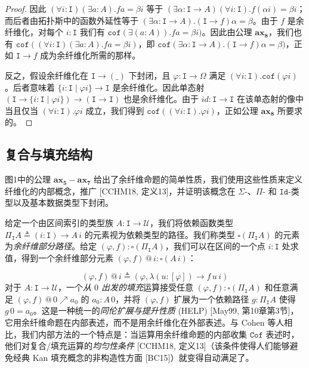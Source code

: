 \documentclass{ctexart}
\theoremstyle{plain}
\theoremstyle{definition}
\theoremstyle{definition}
\theoremstyle{definition}
\theoremstyle{definition}
\newcommand\ttI{\mathtt{I}}
\newcommand{\ax}[1]{\mathbf{ax_{#1}}}
\numberwithin{equation}{section}
\begin{document}
\begin{proof}
因此 $(\forall i : \ttI)(\exists a : A). f a = \beta i$ 等于 $(\exists \alpha : \ttI \to A)(\forall i : \ttI). f(\alpha i) = \beta i$；而后者由拓扑斯中的函数外延性等于 $(\exists \alpha : \ttI \to A). (\ttI \to f)\alpha = \beta$。由于 $f$ 是余纤维化，对每个 $i : \ttI$ 我们有 $\mathtt{cof}(\exists(a : A)). f a = \beta i)$。因此由公理 $\ax{8}$，我们也有 $\mathtt{cof}((\forall i : \ttI)(\exists a : A). f a = \beta i)$，即 $\mathtt{cof}(\exists\alpha : \ttI \to A). (\ttI \to f)\alpha = \beta)$，正如 $\ttI \to f$ 成为余纤维化所需的那样。

反之，假设余纤维化在 $\ttI \to (\_)$ 下封闭，且 $\varphi : \ttI \to \Omega$ 满足 $(\forall i : \ttI). \mathtt{cof}(\varphi i)$。后者意味着 $\{i : \ttI \mid \varphi i\} \to \ttI$ 是余纤维化。因此单态射 $(\ttI \to \{i : \ttI \mid \varphi i\}) \to (\ttI \to \ttI)$ 也是余纤维化。由于 $id : \ttI \to \ttI$ 在该单态射的像中当且仅当 $(\forall i : \ttI). \varphi i$ 成立，我们得到 $\mathtt{cof}((\forall i : \ttI). \varphi i)$，正如公理 $\ax{8}$ 所要求的。
\end{proof}

\subsection{复合与填充结构}

图1中的公理 $\ax{5}-\ax{7}$ 给出了余纤维命题的简单性质，我们使用这些性质来定义纤维化的内部概念，推广 [CCHM18, 定义13]，并证明该概念在 $\Sigma$-、$\Pi$- 和 $\mathtt{Id}$-类型以及基本数据类型下封闭。

给定一个由区间索引的类型族 $A : {\ttI} \to \mathcal{U}$，我们将依赖函数类型 $\Pi_{\ttI} A \triangleq (i : {\ttI}) \to A\, i$ 的元素视为依赖类型的路径。我们称类型 $\square(\Pi_{\ttI} A)$ 的元素为\textit{余纤维部分路径}。给定 $(\varphi, f) : \square(\Pi_{\ttI} A)$，我们可以在区间的一个点 $i : {\ttI}$ 处求值，得到一个余纤维部分元素 $(\varphi, f) \,@\, i : \square(A\, i)$：

\begin{equation}(\varphi, f) \,@\, i \triangleq (\varphi, \lambda(u : [\varphi]) \to f\, u\, i) \end{equation}
对于 $A : {\ttI} \to \mathcal{U}$，一个\textit{从 $0$ 出发的填充}运算接受任意 $(\varphi, f) : \square(\Pi_{\ttI} A)$ 和任意满足 $(\varphi, f) \,@\, 0 \nearrow a_0$ 的 $a_0 : A\, 0$，并将 $(\varphi, f)$ 扩展为一个依赖路径 $g : \Pi_{\ttI} A$ 使得 $g\, 0 = a_0$。这是一种统一的\textit{同伦扩展与提升性质} (HELP) [May99, 第10章第3节]，它用余纤维命题在内部表述，而不是用余纤维化在外部表述。与 Cohen 等人相比，我们内部方法的一个特点是：当运算用余纤维命题的内部收集 $\mathtt{Cof}$ 表述时，他们对复合/填充运算的\textit{均匀性条件} [CCHM18, 定义13]（该条件使得人们能够避免经典 Kan 填充概念的非构造性方面 [BC15]）就变得自动满足了。
\end{document}
